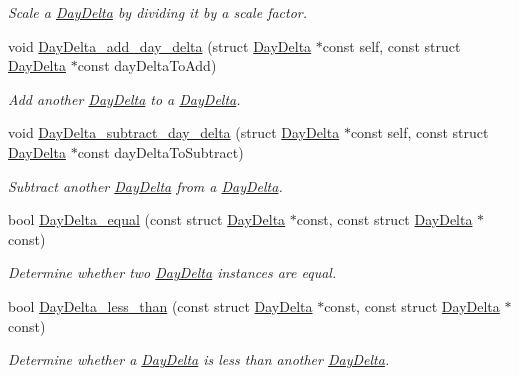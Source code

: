 \begin{DoxyCompactItemize}
\begin{DoxyCompactList}\small\item\em \-Scale a \hyperlink{structDayDelta}{\-Day\-Delta} by dividing it by a scale factor. \end{DoxyCompactList}\item 
void \hyperlink{day-delta_8h_a426015ccd513669683eeea86fcd0f738}{\-Day\-Delta\-\_\-add\-\_\-day\-\_\-delta} (struct \hyperlink{structDayDelta}{\-Day\-Delta} $\ast$const self, const struct \hyperlink{structDayDelta}{\-Day\-Delta} $\ast$const day\-Delta\-To\-Add)
\begin{DoxyCompactList}\small\item\em \-Add another \hyperlink{structDayDelta}{\-Day\-Delta} to a \hyperlink{structDayDelta}{\-Day\-Delta}. \end{DoxyCompactList}\item 
void \hyperlink{day-delta_8h_a17a8ff4ad84533fa91d3ec4e1c863ef5}{\-Day\-Delta\-\_\-subtract\-\_\-day\-\_\-delta} (struct \hyperlink{structDayDelta}{\-Day\-Delta} $\ast$const self, const struct \hyperlink{structDayDelta}{\-Day\-Delta} $\ast$const day\-Delta\-To\-Subtract)
\begin{DoxyCompactList}\small\item\em \-Subtract another \hyperlink{structDayDelta}{\-Day\-Delta} from a \hyperlink{structDayDelta}{\-Day\-Delta}. \end{DoxyCompactList}\item 
bool \hyperlink{day-delta_8h_af7fb70b781745298c9017fefb858a985}{\-Day\-Delta\-\_\-equal} (const struct \hyperlink{structDayDelta}{\-Day\-Delta} $\ast$const, const struct \hyperlink{structDayDelta}{\-Day\-Delta} $\ast$const)
\begin{DoxyCompactList}\small\item\em \-Determine whether two \hyperlink{structDayDelta}{\-Day\-Delta} instances are equal. \end{DoxyCompactList}\item 
bool \hyperlink{day-delta_8h_aaf16ab17f0559951ce1cb3547b5887c7}{\-Day\-Delta\-\_\-less\-\_\-than} (const struct \hyperlink{structDayDelta}{\-Day\-Delta} $\ast$const, const struct \hyperlink{structDayDelta}{\-Day\-Delta} $\ast$const)
\begin{DoxyCompactList}\small\item\em \-Determine whether a \hyperlink{structDayDelta}{\-Day\-Delta} is less than another \hyperlink{structDayDelta}{\-Day\-Delta}. \end{DoxyCompactList}\item 

\end{DoxyCompactItemize}
